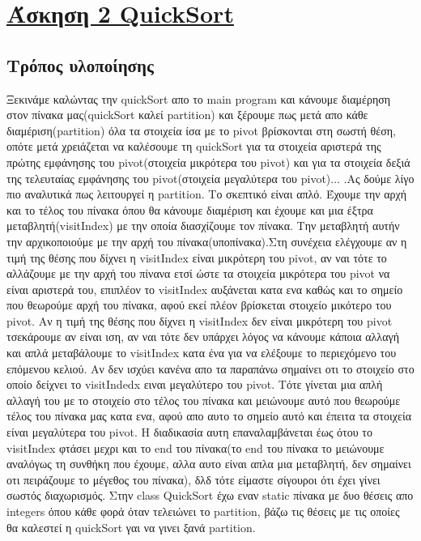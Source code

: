 \documentclass[12pt]{article}
\begin{document}
  \section{\underline{Άσκηση 2 QuickSort}}
  \subsection{Τρόπος υλοποίησης}
  Ξεκινάμε καλώντας την quickSort απο το main program και κάνουμε διαμέρηση στον πίνακα μας(quickSort καλεί partition) και ξέρουμε πως μετά απο κάθε διαμέριση(partition) όλα τα στοιχεία ίσα με το pivot βρίσκονται στη σωστή θέση, οπότε μετά χρειάζεται να καλέσουμε τη quickSort για τα στοιχεία αριστερά της πρώτης εμφάνησης του pivot(στοιχεία μικρότερα του pivot) και για τα στοιχεία δεξιά της τελευταίας εμφάνησης του pivot(στοιχεία μεγαλύτερα του pivot)... .Ας δούμε λίγο πιο αναλυτικά πως λειτουργεί η partition. Το σκεπτικό είναι απλό. Έχουμε την αρχή και το τέλος του πίνακα όπου θα κάνουμε διαμέριση και έχουμε και μια έξτρα μεταβλητή(visitIndex) με την οποία διασχίζουμε τον πίνακα. Την μεταβλητή αυτήν την αρχικοποιούμε με την αρχή του πίνακα(υποπίνακα).Στη συνέχεια ελέγχουμε αν η τιμή της θέσης που δίχνει η visitIndex είναι μικρότερη του pivot, αν ναι τότε το αλλάζουμε με την αρχή του πίνανα ετσί ώστε τα στοιχεία μικρότερα του pivot να είναι αριστερά του, επιπλέον το visitIndex αυξάνεται  κατα ενα καθώς και το σημείο που θεωρούμε αρχή του πίνακα, αφού εκεί πλέον βρίσκεται στοιχείο μικότερο του pivot.  Αν η τιμή της θέσης που δίχνει η visitIndex δεν είναι μικρότερη του pivot τσεκάρουμε αν είναι ιση, αν ναι τότε δεν υπάρχει λόγος να κάνουμε κάποια αλλαγή και απλά μεταβάλουμε το visitIndex κατα ένα για να ελέξουμε το περιεχόμενο του επόμενου κελιού. Αν δεν ισχύει κανένα απο τα παραπάνω σημαίνει οτι το στοιχείο στο οποίο δείχνει το visitIndedx ειναι μεγαλύτερο του pivot. Τότε γίνεται μια απλή αλλαγή του με το στοιχείο στο τέλος του πίνακα και μειώνουμε αυτό που θεωρούμε τέλος του πίνακα μας κατα ενα, αφού απο αυτο το σημείο αυτό και έπειτα τα στοιχεία είναι μεγαλύτερα του pivot. Η διαδικασία αυτη επαναλαμβάνεται έως ότου το visitIndex φτάσει μεχρι και το end του πίνακα(το end του πίνακα το μειώνουμε αναλόγως τη συνθήκη που έχουμε, αλλα αυτο είναι απλα μια μεταβλητή, δεν σημαίνει οτι πειράζουμε το μέγεθος του πίνακα), δλδ τότε είμαστε σίγουροι ότι έχει γίνει σωστός διαχωρισμός. Στην class QuickSort έχω εναν static πίνακα με δυο θέσεις απο integers όπου κάθε φορά όταν τελειώνει το partition, βάζω τις θέσεις με τις οποίες θα καλεστεί η quickSort γαι να γινει ξανά partition. \\
  
\end{document}

